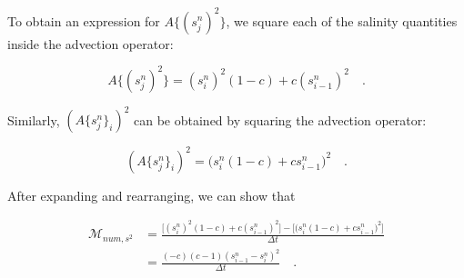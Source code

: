 \documentclass[draft]{agujournal2019}
\begin{document}
To obtain an expression for $A\{(s_j^n)^2 \}$, we square each of the salinity quantities inside the advection operator:
\begin{linenomath*}
\begin{equation}
    A\{(s_j^n)^2 \} = (s_i^n)^2(1-c)+c(s_{i-1}^n)^2 \quad .
\end{equation}
\end{linenomath*}
Similarly, $(A\{s_j^n\}_i)^2$  can be obtained by squaring the advection operator:
\begin{linenomath*}
\begin{equation}
  (A\{s_j^n\}_i)^2 =   \big(s_i^n(1-c)+cs_{i-1}^n \big)^2 \quad .
\end{equation}
\end{linenomath*}
After expanding and rearranging, we can show that
\begin{linenomath*}
\begin{equation} \label{eq:mnum_ons2}
    \begin{split}
    \mathcal{M}_{num, s^2} &= \frac{\bigg[(s_i^n)^2(1-c)+c(s_{i-1}^n)^2 \bigg] -  \bigg[\big(s_i^n(1-c)+cs_{i-1}^n \big)^2 \bigg]}{\Delta t} \\
    & =\frac{(-c)(c-1)(s_{i-1}^n-s_i^n)^2}{\Delta t} \quad .
    \end{split}
\end{equation}
\end{linenomath*}
\end{document}
